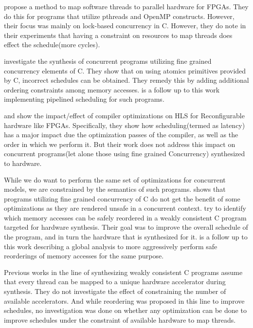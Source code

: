 \documentclass[sigplan,10pt,review]{acmart}
\begin{document}
        \cite{DBLP:conf/fpt/ChoiBA13} propose a method to map software threads to parallel hardware for FPGAs. 
        They do this for programs that utilize pthreads and OpenMP constructs.
        However, their focus was mainly on lock-based concurrency in C. 
        However, they do note in their experiments that having a constraint on resources to map threads does effect the schedule(more cycles). 

        \cite{DBLP:conf/fpga/RamanathanFWC17} investigate the synthesis of concurrent programs utilizing fine grained concurrency elements of C.
        They show that on using atomics primitives provided by C, incorrect schedules can be obtained.
        They remedy this by adding additional ordering constraints among memory accesses.
        \cite{DBLP:journals/tc/RamanathanWC18} is a follow up to this work implementing pipelined scheduling for such programs.
        
        \cite{DBLP:conf/lcpc/CongLPZ12} and \cite{DBLP:conf/fccm/HuangLCCXBA13} show the impact/effect of compiler optimizations on HLS for Reconfigurable hardware like FPGAs.
        Specifically, they show how scheduling(termed as latency) has a major impact due the optimization passes of the compiler, as well as the order in which we perform it. 
        But their work does not address this impact on concurrent programs(let alone those using fine grained Concurrency) synthesized to hardware. 

        While we do want to perform the same set of optimizations for concurrent models, we are constrained by the semantics of such programs.
        \cite{DBLP:conf/popl/VafeiadisBCMN15} shows that programs utilizing fine grained concurrency of C do not get the benefit of some optimizations as they are rendered unsafe in a concurrent context. 
        \cite{DBLP:conf/fccm/RamanathanCW18} try to identify which memory accesses can be safely reordered in a weakly consistent C program targeted for hardware synthesis.
        Their goal was to improve the overall schedule of the program, and in turn the hardware that is synthesized for it. 
        \cite{DBLP:journals/tvlsi/RamanathanCW21} is a follow up to this work describing a global analysis to more aggressively perform safe reorderings of memory accesses for the same purpose.

        Previous works in the line of synthesizing weakly consistent C programs assume that every thread can be mapped to a unique hardware accelerator during synthesis. 
        They do not investigate the effect of constraining the number of available accelerators.
        And while reordering was proposed in this line to improve schedules, no investigation was done on whether any optimization can be done to improve schedules under the constraint of available hardware to map threads.
\end{document}
